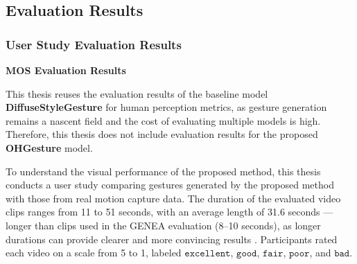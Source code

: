 \subsection{Evaluation Results}
\label{sec:result}

\subsubsection{User Study Evaluation Results}

\textbf{MOS Evaluation Results}

This thesis reuses the evaluation results of the baseline model \textbf{DiffuseStyleGesture} \cite{yang2023diffusestylegesture} for human perception metrics, as gesture generation remains a nascent field and the cost of evaluating multiple models is high. Therefore, this thesis does not include evaluation results for the proposed \textbf{OHGesture} model.


To understand the visual performance of the proposed method, this thesis conducts a user study comparing gestures generated by the proposed method with those from real motion capture data. The duration of the evaluated video clips ranges from 11 to 51 seconds, with an average length of 31.6 seconds — longer than clips used in the GENEA evaluation \cite{yoon2022genea} (8–10 seconds), as longer durations can provide clearer and more convincing results \cite{yang2022reprgesture}. Participants rated each video on a scale from 5 to 1, labeled $\texttt{excellent}$, $\texttt{good}$, $\texttt{fair}$, $\texttt{poor}$, and $\texttt{bad}$. 

